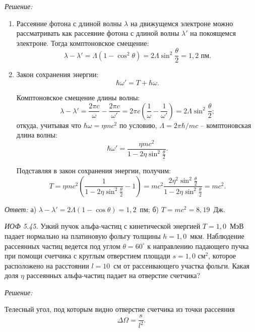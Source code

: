 \vspace*{2em}
\emph{Решение:}
\begin{enumerate}
    \item Рассеяние фотона с длиной волны \( \lambda \) на движущемся электроне
    можно рассматривать как рассеяние фотона с длиной волны \( \lambda' \) на
    покоящемся электроне. Тогда комптоновское смещение:
    \[
        \lambda - \lambda' = \Lambda (1 - \cos^2\theta) = 2\Lambda\sin^2
        \frac{\theta}{2} = 1,2 \text{ пм}.
    \]
    
    \item Закон сохранения энергии:
    \[
        \hbar\omega' = T + \hbar\omega.
    \]
    
    Комптоновское смещение длины волны:
    \[
        \lambda - \lambda' = \frac{2\pi c}{\omega} - \frac{2\pi c}{\omega'} =
        2\pi c\left(\frac{1}{\omega} - \frac{1}{\omega'}\right) = 2\Lambda\sin^2
        \frac{\theta}{2};
    \]
    откуда, учитывая что \( \hbar\omega = \eta mc^2 \) по условию,
    \( \Lambda = 2\pi\hbar/mc \) -- комптоновская длина волны:
    \[
        \hbar\omega' = \frac{\eta mc^2}{1 - 2\eta\sin^2\frac{\theta}{2}}.
    \]
    
    Подставляя в закон сохранения энергии, получим:
    \[
        T = \eta mc^2\left(\frac{1}{1 - 2\eta\sin^2\frac{\theta}{2}} - 1\right)
        = mc^2\frac{2\eta^2\sin^2\frac{\theta}{2}}{1 - 2\eta\sin^2\frac{\theta}
        {2}} = mc^2.
    \]
\end{enumerate}

\vspace*{2em}
\emph{Ответ:} а) \( \lambda - \lambda' = 2\Lambda(1 - \cos\theta) = 1,\!2\)~пм;
б) \( T = mc^2 = 8,\!19 \)~Дж.
\newpage

\emph{ИОФ 5.45.}
Узкий пучок альфа-частиц с кинетической энергией
\( T = 1,\!0 \)~МэВ падает нормально на платиновую фольгу толщины
\( h = 1,\!0 \)~мкм. Наблюдение рассеянных частиц ведется под углом
\( \theta = 60^\circ \) к направлению падающего пучка при помощи счетчика с
круглым отверстием площади \( s = 1,\!0 \text{ см}^2 \), которое расположено на
расстоянии \( l = 10 \)~см от рассеивающего участка фольги. Какая доля
\( \eta \) рассеянных альфа-частиц падает на отверстие счетчика?

\vspace*{2em}
\emph{Решение:}

Телесный угол, под которым видно отверстие счетчика из точки рассеяния
\[
    \Delta\Omega = \frac{s}{l^2}.
\]

